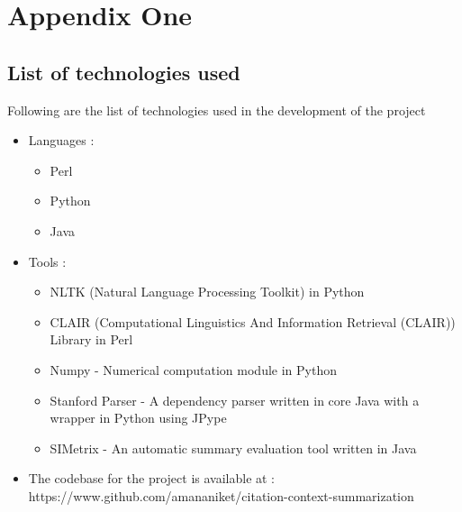 \chapter{Appendix One}
\section{List of technologies used}
Following are the list of technologies used in the development of the project
\begin{itemize}
\item Languages :
    \begin{itemize}
    \item Perl
    \item Python
    \item Java
    \end{itemize}
\item Tools :
\begin{itemize}
\item NLTK (Natural Language Processing Toolkit) in Python
\item CLAIR (Computational Linguistics And Information Retrieval (CLAIR)) Library in Perl
\item Numpy - Numerical computation module in Python
\item Stanford Parser - A dependency parser written in core Java with a wrapper in Python using JPype
\item SIMetrix - An automatic summary evaluation tool written in Java
\end{itemize}
\item The codebase for the project is available at : \\https://www.github.com/amananiket/citation-context-summarization
\end{itemize}
